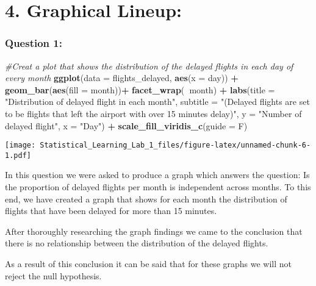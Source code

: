 \documentclass[
]{article}
\newenvironment{Shaded}{\begin{snugshade}}{\end{snugshade}}
\newcommand{\CommentTok}[1]{\textcolor[rgb]{0.56,0.35,0.01}{\textit{#1}}}
\newcommand{\DataTypeTok}[1]{\textcolor[rgb]{0.13,0.29,0.53}{#1}}
\newcommand{\KeywordTok}[1]{\textcolor[rgb]{0.13,0.29,0.53}{\textbf{#1}}}
\newcommand{\NormalTok}[1]{#1}
\newcommand{\OperatorTok}[1]{\textcolor[rgb]{0.81,0.36,0.00}{\textbf{#1}}}
\newcommand{\StringTok}[1]{\textcolor[rgb]{0.31,0.60,0.02}{#1}}
\begin{document}
\hypertarget{graphical-lineup}{%
\section{\texorpdfstring{\textbf{4. Graphical
Lineup:}}{4. Graphical Lineup:}}\label{graphical-lineup}}

\hypertarget{question-1-2}{%
\subsubsection{Question 1:}\label{question-1-2}}

\begin{Shaded}
\begin{Highlighting}[]
\CommentTok{#Creat a plot that shows the distribution of the delayed flights in each day of every month }
\KeywordTok{ggplot}\NormalTok{(}\DataTypeTok{data =}\NormalTok{ flights_delayed, }\KeywordTok{aes}\NormalTok{(}\DataTypeTok{x =}\NormalTok{ day)) }\OperatorTok{+}
\StringTok{  }\KeywordTok{geom_bar}\NormalTok{(}\KeywordTok{aes}\NormalTok{(}\DataTypeTok{fill =}\NormalTok{ month))}\OperatorTok{+}\StringTok{ }\KeywordTok{facet_wrap}\NormalTok{(}\OperatorTok{~}\NormalTok{month) }\OperatorTok{+}\StringTok{ }
\StringTok{  }\KeywordTok{labs}\NormalTok{(}\DataTypeTok{title  =} \StringTok{"Distribution of delayed flight in each month"}\NormalTok{,}
       \DataTypeTok{subtitle =} \StringTok{"(Delayed flights are set to be flights that left the airport with over 15 minutes delay)"}\NormalTok{, }\DataTypeTok{y =} \StringTok{"Number of delayed flight"}\NormalTok{, }\DataTypeTok{x =} \StringTok{"Day"}\NormalTok{) }\OperatorTok{+}\StringTok{ }\KeywordTok{scale_fill_viridis_c}\NormalTok{(}\DataTypeTok{guide =}\NormalTok{ F)}
\end{Highlighting}
\end{Shaded}

\texttt{[image: Statistical\_Learning\_Lab\_1\_files/figure-latex/unnamed-chunk-6-1.pdf]}

In this question we were asked to produce a graph which answers the
question: Is the proportion of delayed flights per month is independent
across months. To this end, we have created a graph that shows for each
month the distribution of flights that have been delayed for more than
15 minutes.

After thoroughly researching the graph findings we came to the
conclusion that there is no relationship between the distribution of the
delayed flights.

As a result of this conclusion it can be said that for these graphs we
will not reject the null hypothesis.
\end{document}
